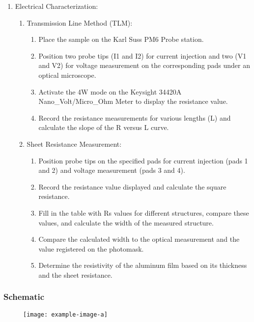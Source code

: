 \begin{enumerate}
    \item Electrical Characterization:
    \begin{enumerate}
        \item Transmission Line Method (TLM):
        \begin{enumerate}
            \item Place the sample on the Karl Suss PM6 Probe station.
            \item Position two probe tips (I1 and I2) for current injection and two (V1 and V2) for voltage measurement on the corresponding pads under an optical microscope.
            \item Activate the 4W mode on the Keysight 34420A Nano\_Volt/Micro\_Ohm Meter to display the resistance value.
            \item Record the resistance measurements for various lengths (L) and calculate the slope of the R versus L curve.
        \end{enumerate}
        
        \item Sheet Resistance Measurement:
        \begin{enumerate}
            \item Position probe tips on the specified pads for current injection (pads 1 and 2) and voltage measurement (pads 3 and 4).
            \item Record the resistance value displayed and calculate the square resistance.
            \item Fill in the table with Rs values for different structures, compare these values, and calculate the width of the measured structure.
            \item Compare the calculated width to the optical measurement and the value registered on the photomask.
            \item Determine the resistivity of the aluminum film based on its thickness and the sheet resistance.
        \end{enumerate}
    \end{enumerate}
\end{enumerate}

\subsubsection{Schematic}
\begin{figure}[h]
\centering
\begin{minipage}{0.5\textwidth}         %
  \centering
  \texttt{[image: example-image-a]}
\end{minipage}
\end{figure}


